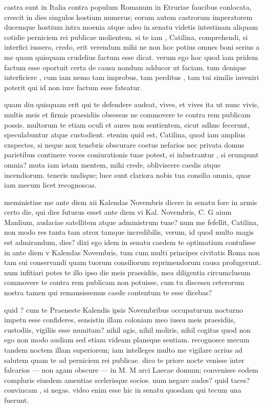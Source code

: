  castra sunt in Italia contra populum Romanum in Etruriae faucibus conlocata, crescit in dies singulos hostium numerus; eorum autem castrorum imperatorem ducemque hostium intra moenia atque adeo in senatu videtis intestinam aliquam cotidie perniciem rei publicae molientem. si te iam , Catilina, comprehendi, si interfici iussero, credo, erit verendum mihi ne non hoc potius omnes boni serius a me quam quisquam crudelius factum esse dicat. verum ego hoc quod iam pridem factum esse oportuit certa de causa nondum adducor ut faciam. tum denique interficiere , cum iam nemo tam improbus, tam perditus , tam tui similis inveniri poterit qui id non iure factum esse fateatur.

 quam diu quisquam erit qui te defendere audeat, vives, et vives ita ut nunc vivis, multis meis et firmis praesidiis obsessus ne commovere te contra rem publicam possis. multorum te etiam oculi et aures non sentientem, sicut adhuc fecerunt, speculabuntur atque custodient. etenim quid est, Catilina, quod iam amplius exspectes, si neque nox tenebris obscurare coetus nefarios nec privata domus parietibus continere voces coniurationis tuae potest, si inlustrantur , si erumpunt omnia? muta iam istam mentem, mihi crede, obliviscere caedis atque incendiorum. teneris undique; luce sunt clariora nobis tua consilia omnia, quae iam mecum licet recognoscas.

 meministine me ante diem xii Kalendas Novembris dicere in senatu fore in armis certo die, qui dies futurus esset ante diem vi Kal. Novembris, C. G aium Manlium, audaciae satellitem atque administrum tuae? num me fefellit, Catilina, non modo res tanta tam atrox tamque incredibilis, verum, id quod multo magis est admirandum, dies? dixi ego idem in senatu caedem te optimatium contulisse in ante diem v Kalendas Novembris, tum cum multi principes civitatis Roma non tam sui conservandi quam tuorum consiliorum reprimendorum causa profugerunt. num infitiari potes te illo ipso die meis praesidiis, mea diligentia circumclusum commovere te contra rem publicam non potuisse, cum tu discessu ceterorum nostra tamen qui remansissemus caede contentum te esse dicebas?

 quid ? cum te Praeneste Kalendis ipsis Novembribus occupaturum nocturno impetu esse confideres, sensistin illam coloniam meo iussu meis praesidiis, custodiis, vigiliis esse munitam? nihil agis, nihil moliris, nihil cogitas quod non ego non modo audiam sed etiam videam planeque sentiam. recognosce mecum tandem noctem illam superiorem; iam intelleges multo me vigilare acrius ad salutem quam te ad perniciem rei publicae. dico te priore nocte venisse inter falcarios — non agam obscure — in M. M arci Laecae domum; convenisse eodem compluris eiusdem amentiae scelerisque socios. num negare audes? quid taces? convincam , si negas. video enim esse hic in senatu quosdam qui tecum una fuerunt.

